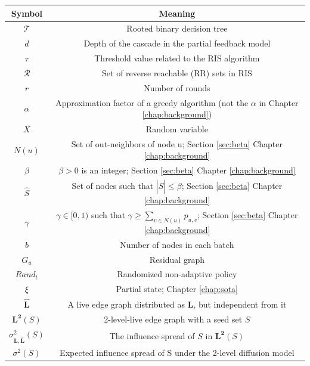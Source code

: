     
    \begin{table} [ht]
    \centering
    \begin{adjustbox}{width=1\textwidth}
    \begin{tabular}{ | c | c | }
    \hline
    \textbf{Symbol}& \textbf{Meaning} \\ [1ex]
     \hline
     \hline
     $\mathcal{T}$& Rooted binary decision tree \\[1ex] \hline
     $d$& Depth of the cascade in the partial feedback model \\[1ex] \hline
     $\tau$& Threshold value related to the RIS algorithm \\[1ex] \hline
     $\mathcal{R}$& Set of reverse reachable (RR) sets in RIS  \\[1ex] \hline
     $r$& Number of rounds \\[1ex] \hline
     $\alpha$& Approximation factor of a greedy algorithm (not the $\alpha$ in Chapter \ref{chap:background}) \\[1ex] \hline
     $X$& Random variable \\[1ex] \hline
    $N(u)$& Set of out-neighbors of node u; Section \ref{sec:beta} Chapter \ref{chap:background}\\[1ex] \hline
    $\beta$& $\beta > 0$ is an integer; Section \ref{sec:beta} Chapter \ref{chap:background}\\[1ex] \hline
    $\hat{S}$& Set of nodes such that $|\hat{S}| \leq \beta$; Section \ref{sec:beta} Chapter \ref{chap:background}\\[1ex] \hline  
    $\gamma$& $\gamma \in [0,1)$ such that $\gamma \geq \sum_{v\in N(u)}p_{u,v}$; Section \ref{sec:beta} Chapter \ref{chap:background}\\[1ex] \hline
    $b$& Number of nodes in each batch\\[1ex] \hline
    $G_u$& Residual graph\\[1ex] \hline
    $Rand_t$& Randomized non-adaptive policy\\[1ex] \hline
    $\xi$& Partial state; Chapter \ref{chap:sota}\\[1ex] \hline
    $\bm{\hat{L}}$& A live edge graph distributed as $\bm{L}$, but independent from it\\[1ex] \hline
    $\bm{L^2}(S)$& 2-level-live edge graph with a seed set $S$\\[1ex] \hline
    $\sigma^2_{\bm{L},\bm{\hat{L}}}(S)$& The influence spread of $S$ in $\bm{L^2}(S)$\\[1ex] \hline
    $\sigma^2(S)$& Expected influence spread of S under the 2-level diffusion model\\[1ex] \hline

\end{tabular}
\end{adjustbox}
\end{table}
